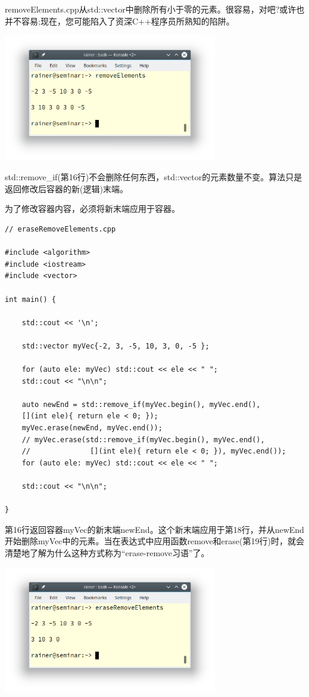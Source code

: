removeElements.cpp从std::vector中删除所有小于零的元素。很容易，对吧?或许也并不容易;现在，您可能陷入了资深C++程序员所熟知的陷阱。

\begin{center}
\includegraphics[width=0.7\textwidth]{content/3/chapter5/images/11.png}\\
\end{center}

std::remove\_if(第16行)不会删除任何东西，std::vector的元素数量不变。算法只是返回修改后容器的新(逻辑)末端。

为了修改容器内容，必须将新末端应用于容器。

\begin{lstlisting}[style=styleCXX]
// eraseRemoveElements.cpp

#include <algorithm>
#include <iostream>
#include <vector>

int main() {
	
	std::cout << '\n';
	
	std::vector myVec{-2, 3, -5, 10, 3, 0, -5 };
	
	for (auto ele: myVec) std::cout << ele << " ";
	std::cout << "\n\n";
	
	auto newEnd = std::remove_if(myVec.begin(), myVec.end(),
	[](int ele){ return ele < 0; });
	myVec.erase(newEnd, myVec.end());
	// myVec.erase(std::remove_if(myVec.begin(), myVec.end(),
	//              [](int ele){ return ele < 0; }), myVec.end());
	for (auto ele: myVec) std::cout << ele << " ";
	
	std::cout << "\n\n";

}
\end{lstlisting}

第16行返回容器myVec的新末端newEnd。这个新末端应用于第18行，并从newEnd开始删除myVec中的元素。当在表达式中应用函数remove和erase(第19行)时，就会清楚地了解为什么这种方式称为“erase-remove习语”了。

\begin{center}
\includegraphics[width=0.7\textwidth]{content/3/chapter5/images/12.png}\\
\end{center}

